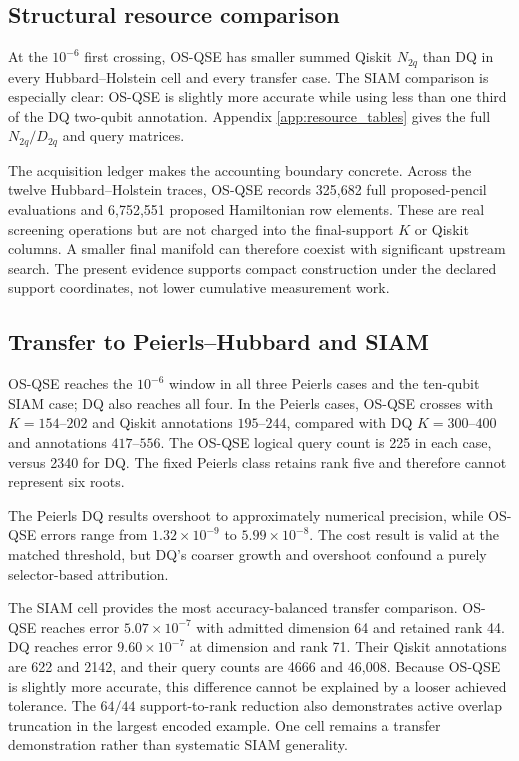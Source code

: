 \documentclass[
  reprint,
  amsmath,
  amssymb,
  aps,
  pra,
  nofootinbib,
  superscriptaddress,
  floatfix
]{revtex4-2}
\begin{document}
\subsection{Structural resource comparison}
\label{sec:resource_results}

At the $10^{-6}$ first crossing, OS-QSE has smaller summed Qiskit $N_{2q}$
than DQ in every Hubbard--Holstein cell and every transfer case.  The SIAM
comparison is especially clear: OS-QSE is slightly more accurate while using
less than one third of the DQ two-qubit annotation.  Appendix
\ref{app:resource_tables} gives the full $N_{2q}/D_{2q}$ and query matrices.

The acquisition ledger makes the accounting boundary concrete.  Across the
twelve Hubbard--Holstein traces, OS-QSE records 325,682 full proposed-pencil
evaluations and 6,752,551 proposed Hamiltonian row elements.  These are real
screening operations but are not charged into the final-support $K$ or Qiskit
columns.  A smaller final manifold can therefore coexist with significant
upstream search.  The present evidence supports compact construction under
the declared support coordinates, not lower cumulative measurement work.

\subsection{Transfer to Peierls--Hubbard and SIAM}
\label{sec:transfer_results}

OS-QSE reaches the $10^{-6}$ window in all three Peierls cases and the
ten-qubit SIAM case; DQ also reaches all four.  In the Peierls cases, OS-QSE
crosses with $K=154$--$202$ and Qiskit annotations $195$--$244$, compared
with DQ $K=300$--$400$ and annotations $417$--$556$.  The OS-QSE logical
query count is 225 in each case, versus 2340 for DQ.  The fixed Peierls class
retains rank five and therefore cannot represent six roots.

The Peierls DQ results overshoot to approximately numerical precision, while
OS-QSE errors range from $1.32\times10^{-9}$ to $5.99\times10^{-8}$.  The
cost result is valid at the matched threshold, but DQ's coarser growth and
overshoot confound a purely selector-based attribution.

The SIAM cell provides the most accuracy-balanced transfer comparison.
OS-QSE reaches error $5.07\times10^{-7}$ with admitted dimension 64 and
retained rank 44.  DQ reaches error $9.60\times10^{-7}$ at dimension and rank
71.  Their Qiskit annotations are 622 and 2142, and their query counts are
4666 and 46,008.  Because OS-QSE is slightly more accurate, this difference
cannot be explained by a looser achieved tolerance.  The $64/44$
support-to-rank reduction also demonstrates active overlap truncation in the
largest encoded example.  One cell remains a transfer demonstration rather
than systematic SIAM generality.
\end{document}
